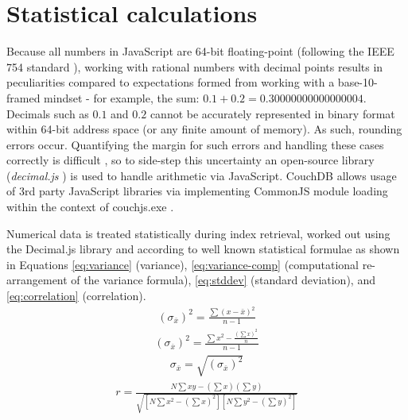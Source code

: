 \section{Statistical calculations}
Because all numbers in JavaScript are 64-bit floating-point (following the IEEE 754 standard \cite{floatingPoint}), working with rational numbers with decimal points results in peculiarities compared to expectations formed from working with a base-10-framed mindset - for example, the sum: $0.1 + 0.2 = 0.30000000000000004$. Decimals such as $0.1$ and $0.2$ cannot be accurately represented in binary format within 64-bit address space (or any finite amount of memory). As such, rounding errors occur. Quantifying the margin for such errors and handling these cases correctly is difficult \cite{Goldberg1991}, so to side-step this uncertainty an open-source library (\textit{decimal.js} \cite{decimaljs}) is used to handle arithmetic via JavaScript. CouchDB allows usage of 3rd party JavaScript libraries via implementing CommonJS module loading within the context of couchjs.exe \cite{commonJsMapFn}.

Numerical data is treated statistically during index retrieval, worked out using the Decimal.js library and according to well known statistical formulae as shown in Equations \ref{eq:variance} (variance), \ref{eq:variance-comp} (computational re-arrangement of the variance formula), \ref{eq:stddev} (standard deviation), and \ref{eq:correlation} (correlation).
\begin{align}
  (\sigma_{\overline{x}})^{2} = \frac{\sum{(x-\bar{x})^2}}{n-1}\label{eq:variance}
\end{align}
\begin{align}
  (\sigma_{\overline{x}})^{2} =  \frac{\sum{x^2} - \frac{(\sum{x})^2}{n}}{n - 1}\label{eq:variance-comp}
\end{align}
\begin{align}
  \sigma_{\overline{x}} = \sqrt{(\sigma_{\overline{x}})^{2}}\label{eq:stddev}
\end{align}
\begin{align}
  r = \frac{N\sum{xy} - (\sum{x})(\sum{y})}{\sqrt{[N\sum{x^2} - (\sum{x})^2][N\sum{y^2} - (\sum{y})^2]}} \label{eq:correlation}
\end{align}